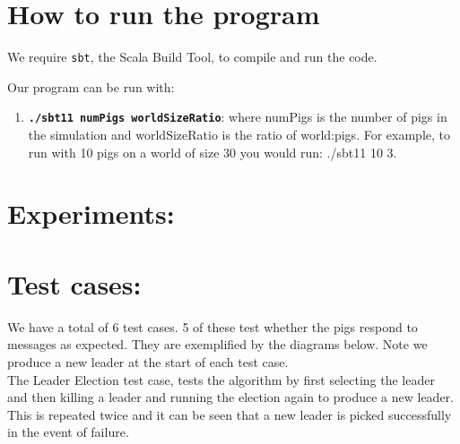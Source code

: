 \documentclass[]{article}
\begin{document}
\section{How to run the program}

We require \texttt{sbt}, the Scala Build Tool, to compile and run the code.

Our program can be run with:

\begin{enumerate}[1.]
\item
  \textbf{\texttt{./sbt11 numPigs worldSizeRatio}}: where numPigs is the number of pigs in the simulation and worldSizeRatio is the ratio of world:pigs. For example, to run with 10 pigs on a world of size 30 you would run: ./sbt11 10 3.
\end{enumerate}

\section{Experiments:}

\pagebreak

\section{Test cases:}
We have a total of 6 test cases. 5 of these test whether the pigs respond to messages as expected. They are exemplified by the diagrams below. Note we produce a new leader at the start of each test case.\\
The Leader Election test case, tests the algorithm by first selecting the leader and then killing a leader and running the election again to produce a new leader. This is repeated twice and it can be seen that a new leader is picked successfully in the event of failure. 
\end{document}
